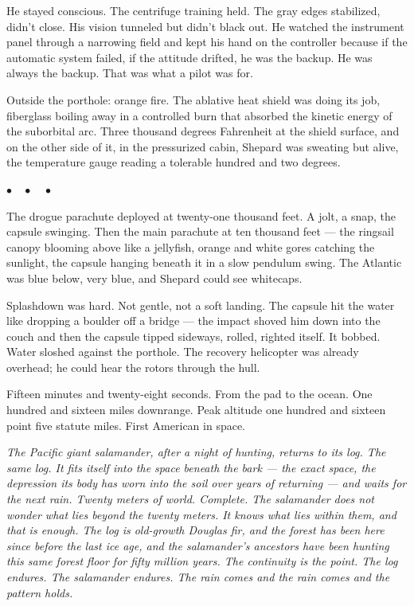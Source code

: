 \documentclass[12pt, letterpaper]{article}
\begin{document}
He stayed conscious. The centrifuge training held. The gray edges stabilized, didn't close. His vision tunneled but didn't black out. He watched the instrument panel through a narrowing field and kept his hand on the controller because if the automatic system failed, if the attitude drifted, he was the backup. He was always the backup. That was what a pilot was for.

Outside the porthole: orange fire. The ablative heat shield was doing its job, fiberglass boiling away in a controlled burn that absorbed the kinetic energy of the suborbital arc. Three thousand degrees Fahrenheit at the shield surface, and on the other side of it, in the pressurized cabin, Shepard was sweating but alive, the temperature gauge reading a tolerable hundred and two degrees.

\begin{center}
$\bullet\quad\bullet\quad\bullet$
\end{center}

The drogue parachute deployed at twenty-one thousand feet. A jolt, a snap, the capsule swinging. Then the main parachute at ten thousand feet --- the ringsail canopy blooming above like a jellyfish, orange and white gores catching the sunlight, the capsule hanging beneath it in a slow pendulum swing. The Atlantic was blue below, very blue, and Shepard could see whitecaps.

Splashdown was hard. Not gentle, not a soft landing. The capsule hit the water like dropping a boulder off a bridge --- the impact shoved him down into the couch and then the capsule tipped sideways, rolled, righted itself. It bobbed. Water sloshed against the porthole. The recovery helicopter was already overhead; he could hear the rotors through the hull.

Fifteen minutes and twenty-eight seconds. From the pad to the ocean. One hundred and sixteen miles downrange. Peak altitude one hundred and sixteen point five statute miles. First American in space.

\emph{The Pacific giant salamander, after a night of hunting, returns to its log. The same log. It fits itself into the space beneath the bark --- the exact space, the depression its body has worn into the soil over years of returning --- and waits for the next rain. Twenty meters of world. Complete. The salamander does not wonder what lies beyond the twenty meters. It knows what lies within them, and that is enough. The log is old-growth Douglas fir, and the forest has been here since before the last ice age, and the salamander's ancestors have been hunting this same forest floor for fifty million years. The continuity is the point. The log endures. The salamander endures. The rain comes and the rain comes and the pattern holds.}
\end{document}
